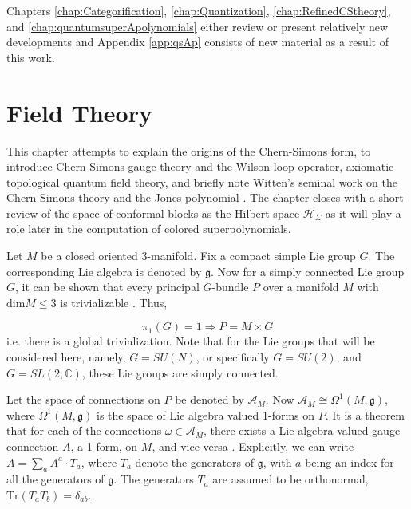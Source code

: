 \documentclass[a4paper,titlepage,twoside]{book}
\begin{document}
Chapters \ref{chap:Categorification}, \ref{chap:Quantization}, \ref{chap:RefinedCStheory}, and \ref{chap:quantumsuperApolynomials} either review or present relatively new developments and Appendix \ref{app:qsAp} consists of new material as a result of this work.  



\chapter{Field Theory} \label{chap:Field Theory}

This chapter attempts to explain the origins of the Chern-Simons form, to introduce Chern-Simons gauge theory and the Wilson loop operator, axiomatic topological quantum field theory, and briefly note Witten's seminal work on the Chern-Simons theory and the Jones polynomial \cite{Witten1989}.  The chapter closes with a short review of the space of conformal blocks as the Hilbert space $\mathcal{H}_{\Sigma}$ as it will play a role later in the computation of colored superpolynomials.  

Let $M$ be a closed oriented 3-manifold.  Fix a compact simple Lie group $G$.  The corresponding Lie algebra is denoted by $\mathfrak{g}$.  Now for a simply connected Lie group $G$, it can be shown that every principal $G$-bundle $P$ over a manifold $M$ with $\text{dim}{M} \leq 3$ is trivializable \cite{Himpel2009}.  Thus,

\begin{equation}
  \pi_1(G) = 1 \Longrightarrow P = M\times G
\end{equation}
i.e. there is a global trivialization.  Note that for the Lie groups that will be considered here, namely, $G=SU(N)$, or specifically $G=SU(2)$, and $G=SL(2,\mathbb{C})$, these Lie groups are simply connected.  

Let the space of connections on $P$ be denoted by $\mathcal{A}_M$.  Now $\mathcal{A}_M \cong \Omega^1(M, \mathfrak{g})$, where $\Omega^1(M, \mathfrak{g})$ is the space of Lie algebra valued 1-forms on $P$.  It is a theorem that for each of the connections $\omega \in \mathcal{A}_M$, there exists a Lie algebra valued gauge connection $A$, a 1-form, on $M$, and vice-versa \cite{Nakahara2003}.  Explicitly, we can write $A = \sum_a A^a\cdot T_a$, where $T_a$ denote the generators of $\mathfrak{g}$, with $a$ being an index for all the generators of $\mathfrak{g}$.  The generators $T_a$ are assumed to be orthonormal, $\text{Tr}{ (T_aT_b)} = \delta_{ab}$.  
\end{document}
